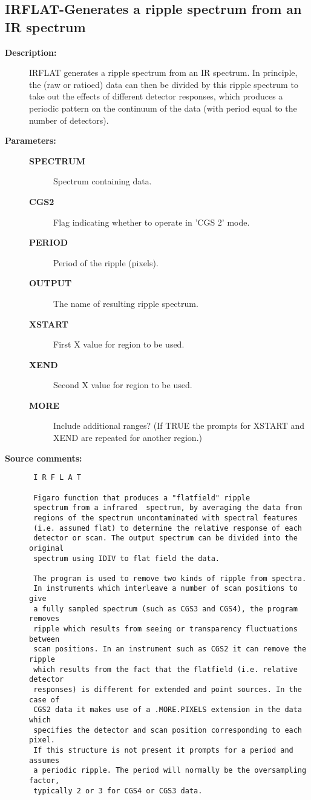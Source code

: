 \subsection{IRFLAT-\label{IRFLAT}Generates a ripple spectrum from an IR spectrum}
\begin{description}

\item [{\bf Description:}]
 IRFLAT generates a ripple spectrum from  an IR spectrum.
 In principle, the (raw or ratioed) data can then be divided
 by this ripple spectrum to take out the effects of different
 detector responses, which produces a periodic pattern on the
 continuum of the data (with period equal to the number of
 detectors).

\item [{\bf Parameters:}]
\begin{description}
\item [{\bf SPECTRUM}]
 Spectrum containing data.
\item [{\bf CGS2}]
 Flag indicating whether to operate in 'CGS 2' mode.
\item [{\bf PERIOD}]
 Period of the ripple (pixels).
\item [{\bf OUTPUT}]
 The name of resulting ripple spectrum.
\item [{\bf XSTART}]
 First X value for region to be used.
\item [{\bf XEND}]
 Second X value for region to be used.
\item [{\bf MORE}]
 Include additional ranges?  (If TRUE the prompts for XSTART and XEND
 are repeated for another region.)
\end{description}

\item [{\bf Source comments:}]
\begin{verbatim}
 I R F L A T

 Figaro function that produces a "flatfield" ripple
 spectrum from a infrared  spectrum, by averaging the data from
 regions of the spectrum uncontaminated with spectral features
 (i.e. assumed flat) to determine the relative response of each
 detector or scan. The output spectrum can be divided into the original
 spectrum using IDIV to flat field the data.

 The program is used to remove two kinds of ripple from spectra.
 In instruments which interleave a number of scan positions to give
 a fully sampled spectrum (such as CGS3 and CGS4), the program removes
 ripple which results from seeing or transparency fluctuations between
 scan positions. In an instrument such as CGS2 it can remove the ripple
 which results from the fact that the flatfield (i.e. relative detector
 responses) is different for extended and point sources. In the case of
 CGS2 data it makes use of a .MORE.PIXELS extension in the data which
 specifies the detector and scan position corresponding to each pixel.
 If this structure is not present it prompts for a period and assumes
 a periodic ripple. The period will normally be the oversampling factor,
 typically 2 or 3 for CGS4 or CGS3 data.


\end{verbatim}
\end{description}

